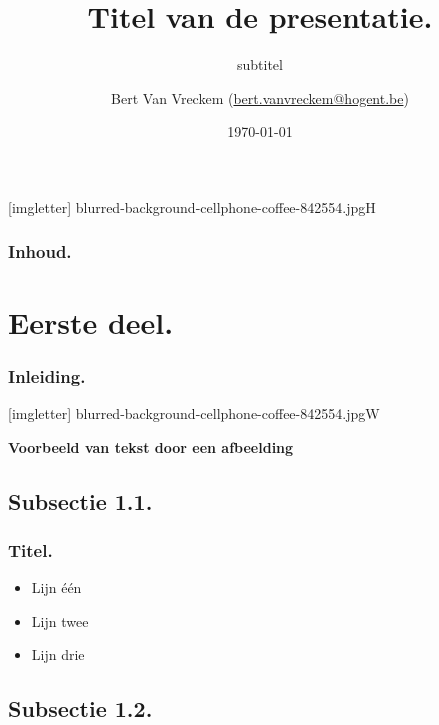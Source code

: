 \documentclass[aspectratio=169]{beamer}
\title[Korte titel]{Titel van de presentatie.}
\subtitle{subtitel}
\author[BVV]{Bert {Van Vreckem} (\href{mailto:bert.vanvreckem@hogent.be}
    {bert.vanvreckem@hogent.be})}
\date{\today}
\begin{document}
{
[imgletter]
    {blurred-background-cellphone-coffee-842554.jpg}{H}

\begin{frame}
    \maketitle
\end{frame}
}

\begin{frame}
    \frametitle{Inhoud.}

    \tableofcontents
\end{frame}

\section{Eerste deel.}

\begin{frame}
    \frametitle{Inleiding.}

    \lipsum*[2]
\end{frame}

{
[imgletter]
    {blurred-background-cellphone-coffee-842554.jpg}{W}

\begin{frame}

    {\huge \textbf{Voorbeeld van tekst door een afbeelding}}

\end{frame}
}

\subsection{Subsectie 1.1.}

\begin{frame}
    \frametitle{Titel.}

    \begin{itemize}
        \item Lijn één
        \item Lijn twee
        \item Lijn drie
    \end{itemize}
\end{frame}

\subsection{Subsectie 1.2.}
\end{document}
